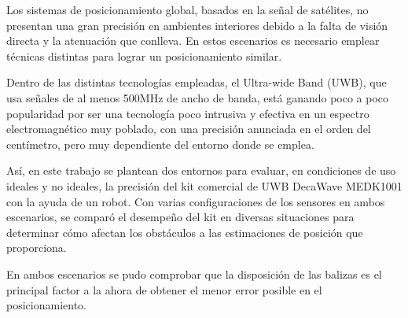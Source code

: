 Los sistemas de posicionamiento global, basados en la señal de satélites, no presentan una gran precisión en ambientes interiores debido a la falta de visión directa y la atenuación que conlleva. En estos escenarios es necesario emplear técnicas distintas para lograr un posicionamiento similar.

Dentro de las distintas tecnologías empleadas, el Ultra-wide Band (UWB), que usa señales de al menos 500MHz de ancho de banda, está ganando poco a poco popularidad por ser una tecnología poco intrusiva y efectiva en un espectro electromagnético muy poblado, con una precisión anunciada en el orden del centímetro, pero muy dependiente del entorno donde se emplea.

Así, en este trabajo se plantean dos entornos para evaluar, en condiciones de uso ideales y no ideales, la precisión del kit comercial de UWB DecaWave MEDK1001 con la ayuda de un robot.
Con varias configuraciones de los sensores en ambos escenarios, se comparó el desempeño del kit en diversas situaciones para determinar cómo afectan los obstáculos a las estimaciones de posición que proporciona.

En ambos escenarios se pudo comprobar que la disposición de las balizas es el principal factor a la ahora de obtener el menor error posible en el posicionamiento.